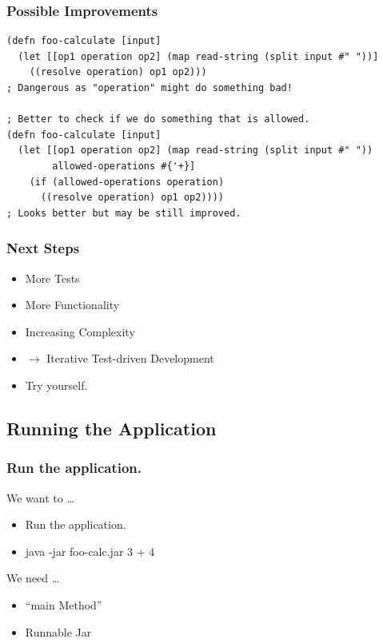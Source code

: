 \documentclass{beamer}
\begin{document}
\begin{frame}[fragile]
\frametitle{Possible Improvements}
\begin{lstlisting}[basicstyle=\scriptsize]
(defn foo-calculate [input]
  (let [[op1 operation op2] (map read-string (split input #" "))]
    ((resolve operation) op1 op2)))
; Dangerous as "operation" might do something bad!

; Better to check if we do something that is allowed.
(defn foo-calculate [input]
  (let [[op1 operation op2] (map read-string (split input #" "))
        allowed-operations #{'+}]
    (if (allowed-operations operation)
      ((resolve operation) op1 op2))))
; Looks better but may be still improved.
\end{lstlisting}
\end{frame}

  \begin{frame}
    \frametitle{Next Steps}
    \begin{itemize}
      \item More Tests
      \item More Functionality
      \item Increasing Complexity
      \item $\rightarrow$ Iterative Test-driven Development
      \item Try yourself.
    \end{itemize}
  \end{frame}

  \subsection{Running the Application}

  \begin{frame}
    \frametitle{Run the application.}
    \begin{block}{We want to \ldots}
        \begin{itemize}
          \item Run the application.
          \item java -jar foo-calc.jar 3 + 4
        \end{itemize}
    \end{block}
    \begin{block}{We need \ldots}
        \begin{itemize}
          \item ``main Method''
          \item Runnable Jar
        \end{itemize}
    \end{block}
  \end{frame}
\end{document}
